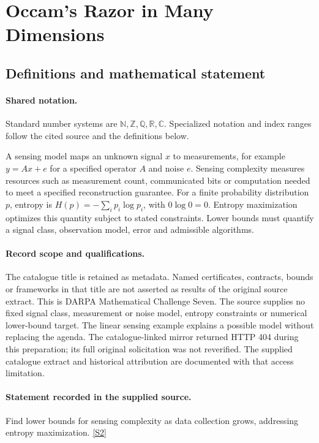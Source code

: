 \documentclass[11pt]{article}
\newcommand{\sref}[2]{\hyperlink{source:#1:#2}{[S#2]}}
\begin{document}
\section{Occam's Razor in Many Dimensions}\label{statement}

\subsection{Definitions and mathematical statement}

\paragraph{Shared notation.}Standard number systems are $\mathbb N,\mathbb Z,\mathbb Q,\mathbb R,\mathbb C$. Specialized notation and index ranges follow the cited source and the definitions below.


A sensing model maps an unknown signal $x$ to measurements, for example $y=Ax+e$ for a specified operator $A$ and noise $e$. Sensing complexity measures resources such as measurement count, communicated bits or computation needed to meet a specified reconstruction guarantee. For a finite probability distribution $p$, entropy is $H(p)=-\sum_i p_i\log p_i$, with $0\log0=0$. Entropy maximization optimizes this quantity subject to stated constraints. Lower bounds must quantify a signal class, observation model, error and admissible algorithms.
\paragraph{Record scope and qualifications.}
The catalogue title is retained as metadata. Named certificates, contracts, bounds or frameworks in that title are not asserted as results of the original source extract.
This is DARPA Mathematical Challenge Seven. The source supplies no fixed signal class, measurement or noise model, entropy constraints or numerical lower-bound target. The linear sensing example explains a possible model without replacing the agenda. The catalogue-linked mirror returned HTTP 404 during this preparation; its full original solicitation was not reverified. The supplied catalogue extract and historical attribution are documented with that access limitation.
\paragraph{Statement recorded in the supplied source.}
Find lower bounds for sensing complexity as data collection grows, addressing entropy maximization. \sref{statement}{2}
\end{document}
